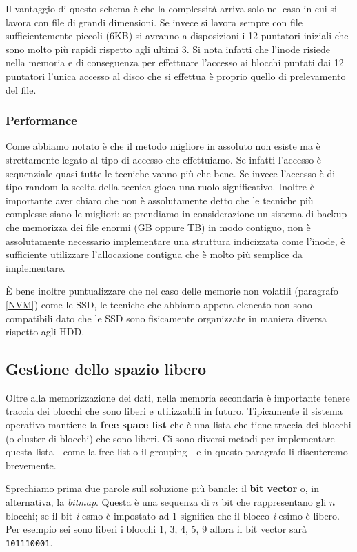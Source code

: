 Il vantaggio di questo schema è che la complessità arriva solo nel caso in cui si lavora con file di grandi dimensioni. Se invece si lavora sempre con file sufficientemente piccoli (6KB) si avranno a disposizioni i 12 puntatori iniziali che sono molto più rapidi rispetto agli ultimi 3. Si nota infatti che l'inode risiede nella memoria e di conseguenza per effettuare l'accesso ai blocchi puntati dai 12 puntatori l'unica accesso al disco che si effettua è proprio quello di prelevamento del file. 

% 
\subsubsection{Performance}\label{performance SSD}
Come abbiamo notato è che il metodo migliore in assoluto non esiste ma è strettamente legato al tipo di accesso che effettuiamo. Se infatti l'accesso è sequenziale quasi tutte le tecniche vanno più che bene. Se invece l'accesso è di tipo random la scelta della tecnica gioca una ruolo significativo. Inoltre è importante aver chiaro che non è assolutamente detto che le tecniche più complesse siano le migliori: se prendiamo in considerazione un sistema di backup che memorizza dei file enormi (GB oppure TB) in modo contiguo, non è assolutamente necessario implementare una struttura indicizzata come l'inode, è sufficiente utilizzare l'allocazione contigua che è molto più semplice da implementare.

È bene inoltre puntualizzare che nel caso delle memorie non volatili (paragrafo \ref{NVM}) come le SSD, le tecniche che abbiamo appena elencato non sono compatibili dato che le SSD sono fisicamente organizzate in maniera diversa rispetto agli HDD.

% 
\subsection{Gestione dello spazio libero}\label{free space}
Oltre alla memorizzazione dei dati, nella memoria secondaria è importante tenere traccia dei blocchi che sono liberi e utilizzabili in futuro. Tipicamente il sistema operativo mantiene la \textbf{free space list} che è una lista che tiene traccia dei blocchi (o cluster di blocchi) che sono liberi. Ci sono diversi metodi per implementare questa lista - come la free list o il grouping - e in questo paragrafo li discuteremo brevemente. 

Sprechiamo prima due parole sull soluzione più banale: il \textbf{bit vector} o, in alternativa, la \textit{bitmap}. Questa è una sequenza di $n$ bit che rappresentano gli $n$ blocchi; se il bit \textit{i}-esmo è impostato ad 1 significa che il blocco \textit{i}-esimo è libero. Per esempio sei sono liberi i blocchi 1, 3, 4, 5, 9 allora il bit vector sarà \texttt{101110001}.

